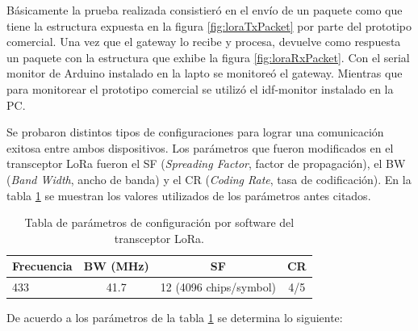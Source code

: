 Básicamente la prueba realizada consistieró en el envío de un paquete como que tiene la estructura expuesta en la figura \ref{fig:loraTxPacket} por parte del prototipo comercial. Una vez que el gateway lo recibe y procesa, devuelve como respuesta un paquete con la estructura que exhibe la figura \ref{fig:loraRxPacket}. Con el serial monitor de Arduino instalado en la lapto se monitoreó el gateway. Mientras que para monitorear el prototipo comercial se utilizó el idf-monitor instalado en la PC. 
%
%

Se probaron distintos tipos de configuraciones para lograr una comunicación exitosa entre ambos dispositivos. Los parámetros que fueron modificados en el transceptor LoRa fueron el SF (\textit{Spreading Factor}, factor de propagación), el BW (\textit{Band Width}, ancho de banda) y el CR (\textit{Coding Rate}, tasa de codificación). En la tabla \ref{tab:testLoraTable} se muestran los valores utilizados de los parámetros antes citados.

\begin{table}[h]
	\centering
	\caption[Parámetros del transceptor LoRa]{Tabla de parámetros de configuración por software del transceptor LoRa.}
	\begin{tabular}{l c c c}    
		\toprule
		\textbf{Frecuencia} & \textbf{BW (MHz)} & \textbf{SF} & \textbf{CR}  \\
		\midrule
		433 & 41.7 & 12 (4096 chips/symbol) & 4/5 \\		
		\bottomrule
		\hline
	\end{tabular}
	\label{tab:testLoraTable}
\end{table}

De acuerdo a los parámetros de la tabla \ref{tab:testLoraTable} se determina lo siguiente:

